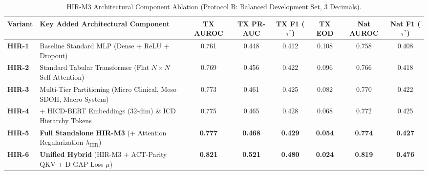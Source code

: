 \documentclass[10pt,journal]{IEEEtran}
\begin{document}
\begin{table}[!t]
\caption{HIR-M3 Architectural Component Ablation (Protocol B: Balanced Development Set, 3 Decimals).}
\label{tab:s_hir_ablation}
\centering
\footnotesize
\begin{tabular}{llcccccc}
\toprule
\textbf{Variant} & \textbf{Key Added Architectural Component} & \textbf{TX AUROC} & \textbf{TX PR-AUC} & \textbf{TX F1 ($\tau^*$)} & \textbf{TX EOD} & \textbf{Nat AUROC} & \textbf{Nat F1 ($\tau^*$)} \\
\midrule
\textbf{HIR-1} & Baseline Standard MLP (Dense + ReLU + Dropout) & 0.761 & 0.448 & 0.412 & 0.108 & 0.758 & 0.408 \\
\textbf{HIR-2} & Standard Tabular Transformer (Flat $N \times N$ Self-Attention) & 0.769 & 0.456 & 0.422 & 0.096 & 0.766 & 0.418 \\
\textbf{HIR-3} & Multi-Tier Partitioning (Micro Clinical, Meso SDOH, Macro System) & 0.773 & 0.461 & 0.425 & 0.082 & 0.770 & 0.422 \\
\textbf{HIR-4} & + HICD-BERT Embeddings ($32$-dim) \& ICD Hierarchy Tokens & 0.775 & 0.465 & 0.428 & 0.068 & 0.772 & 0.425 \\
\textbf{HIR-5} & \textbf{Full Standalone HIR-M3} (+ Attention Regularization $\lambda_{\text{HIR}}$) & \textbf{0.777} & \textbf{0.468} & \textbf{0.429} & \textbf{0.054} & \textbf{0.774} & \textbf{0.427} \\
\textbf{HIR-6} & \textbf{Unified Hybrid} (HIR-M3 + ACT-Parity QKV + D-GAP Loss $\mu$) & \textbf{0.821} & \textbf{0.521} & \textbf{0.480} & \textbf{0.024} & \textbf{0.819} & \textbf{0.476} \\
\bottomrule
\end{tabular}
\end{table}
\end{document}
